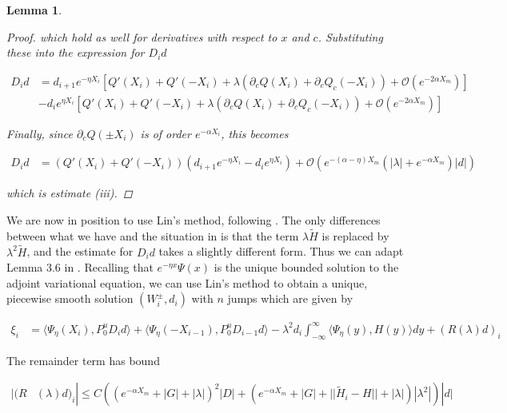 \documentclass[12pt]{article}
\newtheorem{lemma}{Lemma}
\begin{document}
\begin{lemma}
\begin{proof}
which hold as well for derivatives with respect to $x$ and $c$. Substituting these into the expression for $D_i d$

\begin{align*}
D_i d &= d_{i+1} e^{-\eta X_i} \left[ Q'(X_i) + Q'(-X_i) + \lambda( \partial_c Q(X_i) + \partial_c Q_c(-X_i)) + \mathcal{O} \left( e^{-2 \alpha X_m} \right) \right] \\
&- d_i e^{\eta X_i} \left[ Q'(X_i) + Q'(-X_i) + \lambda( \partial_c Q(X_i) + \partial_c Q_c(-X_i)) + \mathcal{O} \left( e^{-2 \alpha X_m} \right) \right]
\end{align*}

Finally, since $\partial_c Q(\pm X_i)$ is of order $e^{-\alpha X_i}$, this becomes

\begin{align*}
D_i d &= ( Q'(X_i) + Q'(-X_i) )(d_{i+1} e^{-\eta X_i} - d_i e^{\eta X_i})
+ \mathcal{O} \left( e^{-(\alpha - \eta) X_m}\left( |\lambda| +  e^{-\alpha X_m} \right) |d| \right)
\end{align*}

which is estimate (iii).

\end{proof}
\end{lemma}

We are now in position to use Lin's method, following \cite{Sandstede1998}. The only differences between what we have and the situation in \cite{Sandstede1998} is that the term $\lambda \tilde{H}$ is replaced by $\lambda^2 \tilde{H}$, and the estimate for $D_i d$ takes a slightly different form. Thus we can adapt Lemma 3.6 in \cite{Sandstede1998}. Recalling that $e^{-\eta x}\Psi(x)$ is the unique bounded solution to the adjoint variational equation, we can use Lin's method to obtain a unique, piecewise smooth solution $(W_i^\pm, d_i)$ with $n$ jumps which are given by

\begin{align*}
\xi_i &= \langle \Psi_\eta(X_i), P_0^u D_i d \rangle
+ \langle \Psi_\eta(-X_{i-1}), P_0^u D_{i-1} d \rangle
- \lambda^2 d_i \int_{-\infty}^\infty \langle \Psi_\eta(y), H(y) \rangle dy
+ (R(\lambda)d)_i
\end{align*}

The remainder term has bound

\begin{align*}
|(R&(\lambda)d)_i| \leq C \left( (e^{-\alpha X_m} + |G| + |\lambda|)^2 |D| + (e^{-\alpha X_m} + |G| + ||\tilde{H}_i - H|| + |\lambda| )|\lambda^2| \right)|d|
\end{align*}
\end{document}
